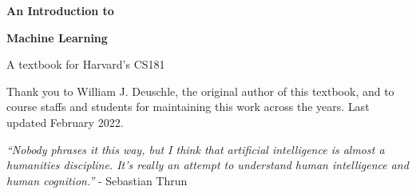 \documentclass{textbook}
\begin{document}
  \frontmatter

  \thispagestyle{empty}
  \begin{center}
    {\huge\bfseries An Introduction to}
    \vspace{1em}\par
    {\Huge\bfseries Machine Learning}
    \vspace{0.25in}\par
    {\large A textbook for Harvard's CS181}
    \vfill
  \end{center}
  \clearpage

  \thispagestyle{empty}
  \begin{center}
    {\small Thank you to William J. Deuschle, the original author of this textbook, and to course staffs and students for maintaining this work across the years.}
    \vfill
    {\small Last updated February 2022.}
  \end{center}
  \clearpage

  \vspace*{2in}
  \thispagestyle{empty}
  {\itshape ``Nobody phrases it this way, but I think that artificial intelligence is almost a humanities discipline. It’s really an attempt to understand human intelligence and human cognition.''}
  \vskip 0.1in
  {\hfill - Sebastian Thrun}
  \clearpage
  \restoregeometry

	\tableofcontents
  \clearpage

  
  \clearpage

  \mainmatter
  
  
\end{document}
